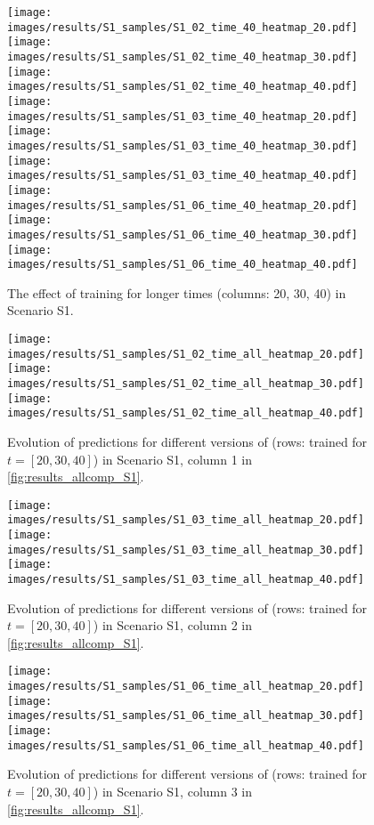 \begin{figure*}[h]
\centering
\texttt{[image: images/results/S1\_samples/S1\_02\_time\_40\_heatmap\_20.pdf]}
\texttt{[image: images/results/S1\_samples/S1\_02\_time\_40\_heatmap\_30.pdf]}
\texttt{[image: images/results/S1\_samples/S1\_02\_time\_40\_heatmap\_40.pdf]}
\texttt{[image: images/results/S1\_samples/S1\_03\_time\_40\_heatmap\_20.pdf]}
\texttt{[image: images/results/S1\_samples/S1\_03\_time\_40\_heatmap\_30.pdf]}
\texttt{[image: images/results/S1\_samples/S1\_03\_time\_40\_heatmap\_40.pdf]}
\texttt{[image: images/results/S1\_samples/S1\_06\_time\_40\_heatmap\_20.pdf]}
\texttt{[image: images/results/S1\_samples/S1\_06\_time\_40\_heatmap\_30.pdf]}
\texttt{[image: images/results/S1\_samples/S1\_06\_time\_40\_heatmap\_40.pdf]}
\caption{The effect of training \NetFour for longer times (columns: 20, 30, 40) in Scenario S1.}
\label{fig:results_trainmore_S1}\end{figure*}
\begin{figure*}[h]
\centering
\texttt{[image: images/results/S1\_samples/S1\_02\_time\_all\_heatmap\_20.pdf]}
\texttt{[image: images/results/S1\_samples/S1\_02\_time\_all\_heatmap\_30.pdf]}
\texttt{[image: images/results/S1\_samples/S1\_02\_time\_all\_heatmap\_40.pdf]}
\caption{Evolution of predictions for different versions of \NetFour(rows: trained for $t=[20, 30, 40]$) in Scenario S1, column 1 in \cref{fig:results_allcomp_S1}.}
\label{fig:results_softmax_over_time_S1_1}\end{figure*}
\begin{figure*}[h]
\centering
\texttt{[image: images/results/S1\_samples/S1\_03\_time\_all\_heatmap\_20.pdf]}
\texttt{[image: images/results/S1\_samples/S1\_03\_time\_all\_heatmap\_30.pdf]}
\texttt{[image: images/results/S1\_samples/S1\_03\_time\_all\_heatmap\_40.pdf]}
\caption{Evolution of predictions for different versions of \NetFour(rows: trained for $t=[20, 30, 40]$) in Scenario S1, column 2 in \cref{fig:results_allcomp_S1}.}
\label{fig:results_softmax_over_time_S1_2}\end{figure*}
\begin{figure*}[h]
\centering
\texttt{[image: images/results/S1\_samples/S1\_06\_time\_all\_heatmap\_20.pdf]}
\texttt{[image: images/results/S1\_samples/S1\_06\_time\_all\_heatmap\_30.pdf]}
\texttt{[image: images/results/S1\_samples/S1\_06\_time\_all\_heatmap\_40.pdf]}
\caption{Evolution of predictions for different versions of \NetFour(rows: trained for $t=[20, 30, 40]$) in Scenario S1, column 3 in \cref{fig:results_allcomp_S1}.}
\label{fig:results_softmax_over_time_S1_3}\end{figure*}
